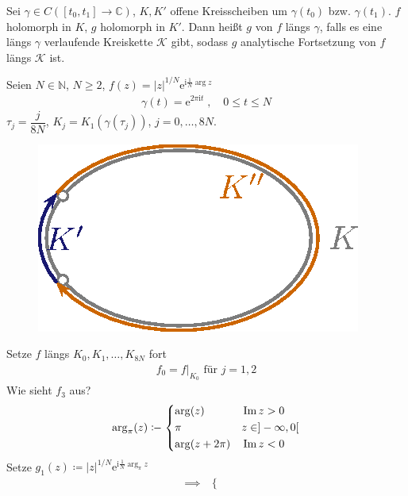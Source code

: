 \documentclass[a4paper,10pt]{scrbook}
\begin{document}
\begin{theorem}[Definition]
  Sei $\gamma \in C([t_0,t_1] \to \mathbb{C})$, $K,K'$ offene Kreisscheiben um $\gamma(t_0)$ bzw. $\gamma(t_1)$. $f$ holomorph in $K$, $g$ holomorph in $K'$. Dann heißt $g$  von $f$ längs $\gamma$, falls es eine längs $\gamma$ verlaufende Kreiskette $\mathcal{K}$ gibt, sodass $g$ analytische Fortsetzung von $f$ längs $\mathcal{K}$ ist.
\end{theorem}

\begin{example} Seien
  $N \in \mathbb{N}$, $N \geq 2$, $f(z) = |z|^{1/N} \mathrm{e}^{\mathrm{i}\frac{1}{N}\arg z}$
  \begin{align*}
    \gamma(t) = \mathrm{e}^{2 \pi \mathrm{i} t} \; , \quad 0 \leq t \leq N
  \end{align*}
  $\tau_j = \dfrac{j}{8N}$, $K_j = K_1(\gamma(\tau_j))$, $j = 0,\ldots,8N$.
  \begin{figure}[H]
    \centering
    \includegraphics[scale=0.2]{images/ana3-tmp-46}
  \end{figure}
  Setze $f$ längs $K_0,K_1,\ldots,K_{8N}$ fort
  \begin{align*}
    f_0 = f \Big|_{K_0} \text{ für } j = 1,2
  \end{align*}
  Wie sieht $f_3$ aus?
  \begin{align*}
    \arg_\pi (z) \coloneq
    \begin{dcases}
      \arg(z) & \Im z > 0 \\
      \pi & z \in ]-\infty,0[ \\
      \arg(z+2\pi) & \Im z < 0
    \end{dcases}
  \end{align*}
  Setze $g_1(z) \coloneq |z|^{1/N} \mathrm{e}^{\mathrm{i}\frac{1}{N}\arg_\pi z}$
  \begin{align*}
    \implies&
    \begin{cases}

\end{cases}
\end{align*}
\end{example}
\end{document}
